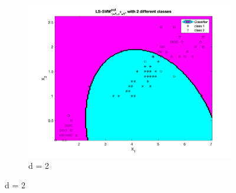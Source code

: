 \documentclass[a4paper, 11pt, one column]{article}
\begin{document}
\begin{figure}[]
\begin{subfigure}{0.33\linewidth}
            \includegraphics[width=\linewidth]{images/ls_svm_poly_deg2.png}
            \caption{d = 2}
        \end{subfigure}


\end{figure}
\end{document}
